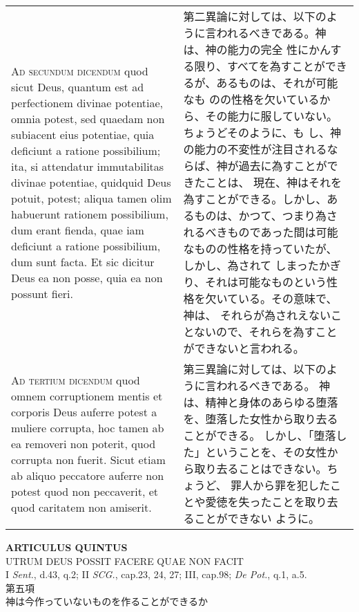 \documentclass[10pt]{jsarticle} %
\begin{document}
\begin{longtable}{p{21em}p{21em}}
\\


{\scshape Ad secundum dicendum} quod sicut Deus, quantum
est ad perfectionem divinae potentiae, omnia potest, sed quaedam non
subiacent eius potentiae, quia deficiunt a ratione possibilium; ita, si
attendatur immutabilitas divinae potentiae, quidquid Deus potuit,
potest; aliqua tamen olim habuerunt rationem possibilium, dum erant
fienda, quae iam deficiunt a ratione possibilium, dum sunt facta. Et sic
dicitur Deus ea non posse, quia ea non possunt fieri.


&

第二異論に対しては、以下のように言われるべきである。神は、神の能力の完全
性にかんする限り、すべてを為すことができるが、あるものは、それが可能なも
のの性格を欠いているから、その能力に服していない。ちょうどそのように、も
し、神の能力の不変性が注目されるならば、神が過去に為すことができたことは、
現在、神はそれを為すことができる。しかし、あるものは、かつて、つまり為さ
れるべきものであった間は可能なものの性格を持っていたが、しかし、為されて
しまったかぎり、それは可能なものという性格を欠いている。その意味で、神は、
それらが為されえないことないので、それらを為すことができないと言われる。

\\


{\scshape Ad tertium dicendum} quod omnem corruptionem
mentis et corporis Deus auferre potest a muliere corrupta, hoc tamen ab
ea removeri non poterit, quod corrupta non fuerit. Sicut etiam ab aliquo
peccatore auferre non potest quod non peccaverit, et quod caritatem non
amiserit.


&


第三異論に対しては、以下のように言われるべきである。
神は、精神と身体のあらゆる堕落を、堕落した女性から取り去ることができる。
 しかし、「堕落した」ということを、その女性から取り去ることはできない。ちょうど、
 罪人から罪を犯したことや愛徳を失ったことを取り去ることができない
 ように。


\end{longtable}
\newpage




\begin{center}
 {\Large {\bf ARTICULUS QUINTUS}}\\
 {\large UTRUM DEUS POSSIT FACERE QUAE NON FACIT}\\
 {\footnotesize I {\itshape Sent.}, d.43, q.2; II {\itshape SCG.},
 cap.23, 24, 27; III, cap.98; {\itshape De Pot.}, q.1, a.5.}\\
 {\Large 第五項\\神は今作っていないものを作ることができるか}
\end{center}
\end{document}
